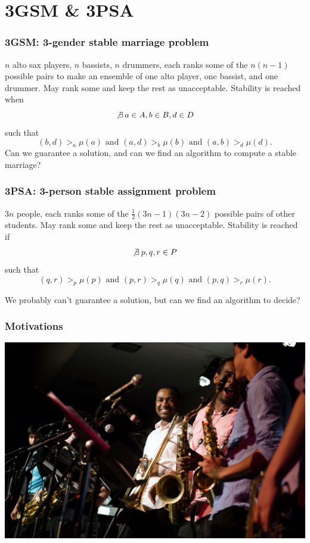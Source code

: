 \documentclass[mathserif,serif]{beamer}
\begin{document}
\frame{\titlepage}

\begin{frame}
	\tableofcontents
\end{frame}


\section{3GSM \& 3PSA}

\begin{frame}
	\frametitle{3GSM: 3-gender stable marriage problem}

	$n$ alto sax players, $n$ bassists, $n$ drummers, each ranks some of the $n(n-1)$ possible pairs to make an
	ensemble of one alto player, one bassist, and one drummer.
	May rank some and keep the rest as unacceptable.
	Stability is reached when
	\[
	\not\exists \: a \in A, b \in B, d \in D
	\]
	such that
	\[
	(b,d) >_a \mu(a) \text{ and } (a,d) >_b \mu(b) \text{ and } (a,b) >_d \mu(d).
	\]
	Can we guarantee a solution, and can we find an algorithm to compute a stable marriage?
\end{frame}

\begin{frame}
	\frametitle{3PSA: 3-person stable assignment problem}

	$3n$ people, each ranks some of the $\frac{1}{2}(3n-1)(3n-2)$ possible pairs of other students.
	May rank some and keep the rest as unacceptable.
	Stability is reached if
	\[
	\not\exists \: p, q, r \in P
	\]
	such that
	\[
	(q,r) >_p \mu(p) \text{ and } (p,r) >_q \mu(q) \text{ and } (p,q) >_r \mu(r).
	\]

	We probably can't guarantee a solution, but can we find an algorithm to decide?
\end{frame}

\begin{frame}
	\frametitle{Motivations}

	\includegraphics[width=\textwidth]{cat-jazz}
\end{frame}
\end{document}
